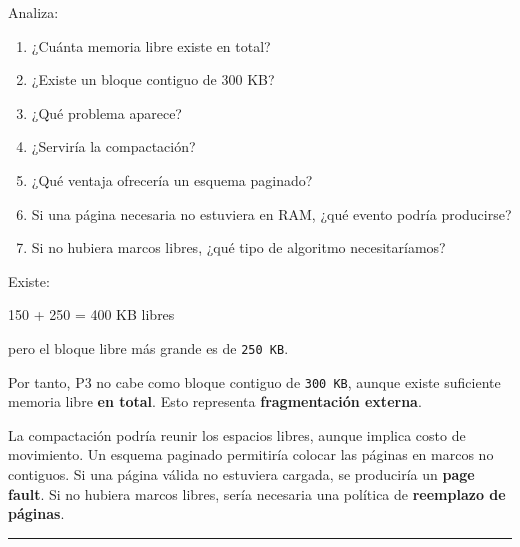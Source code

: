 \documentclass[
  spanish,
  letterpaper,
]{scrbook}
\newenvironment{Shaded}{\begin{snugshade}}{\end{snugshade}}
\newcommand{\NormalTok}[1]{\textcolor[rgb]{0.00,0.23,0.31}{#1}}
\providecommand{\tightlist}{%
  \setlength{\itemsep}{0pt}\setlength{\parskip}{0pt}}
\begin{document}
Analiza:

\begin{enumerate}
\def\labelenumi{\arabic{enumi}.}
\tightlist
\item
  ¿Cuánta memoria libre existe en total?
\item
  ¿Existe un bloque contiguo de 300 KB?
\item
  ¿Qué problema aparece?
\item
  ¿Serviría la compactación?
\item
  ¿Qué ventaja ofrecería un esquema paginado?
\item
  Si una página necesaria no estuviera en RAM, ¿qué evento podría
  producirse?
\item
  Si no hubiera marcos libres, ¿qué tipo de algoritmo necesitaríamos?
\end{enumerate}

\begin{tcolorbox}[enhanced jigsaw, arc=.35mm, bottomrule=.15mm, bottomtitle=1mm, breakable, colback=white, colbacktitle=quarto-callout-tip-color!10!white, colframe=quarto-callout-tip-color-frame, coltitle=black, left=2mm, leftrule=.75mm, opacityback=0, opacitybacktitle=0.6, rightrule=.15mm, title=\textcolor{quarto-callout-tip-color}{\faLightbulb}\hspace{0.5em}{✅ Solución propuesta}, titlerule=0mm, toprule=.15mm, toptitle=1mm]

Existe:

\begin{Shaded}
\begin{Highlighting}[]
\NormalTok{150 + 250 = 400 KB libres}
\end{Highlighting}
\end{Shaded}

pero el bloque libre más grande es de \texttt{250\ KB}.

Por tanto, P3 no cabe como bloque contiguo de \texttt{300\ KB}, aunque
existe suficiente memoria libre \textbf{en total}. Esto representa
\textbf{fragmentación externa}.

La compactación podría reunir los espacios libres, aunque implica costo
de movimiento. Un esquema paginado permitiría colocar las páginas en
marcos no contiguos. Si una página válida no estuviera cargada, se
produciría un \textbf{page fault}. Si no hubiera marcos libres, sería
necesaria una política de \textbf{reemplazo de páginas}.

\end{tcolorbox}

\begin{center}\rule{0.5\linewidth}{0.5pt}\end{center}
\end{document}
